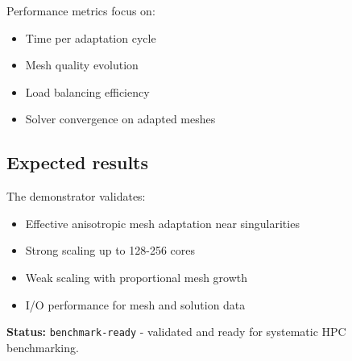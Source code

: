 Performance metrics focus on:
\begin{itemize}
\item Time per adaptation cycle
\item Mesh quality evolution
\item Load balancing efficiency
\item Solver convergence on adapted meshes
\end{itemize}

\subsection{Expected results}

The demonstrator validates:
\begin{itemize}
\item Effective anisotropic mesh adaptation near singularities
\item Strong scaling up to 128-256 cores
\item Weak scaling with proportional mesh growth
\item I/O performance for mesh and solution data
\end{itemize}

\textbf{Status:} \texttt{benchmark-ready} - validated and ready for systematic HPC benchmarking.

